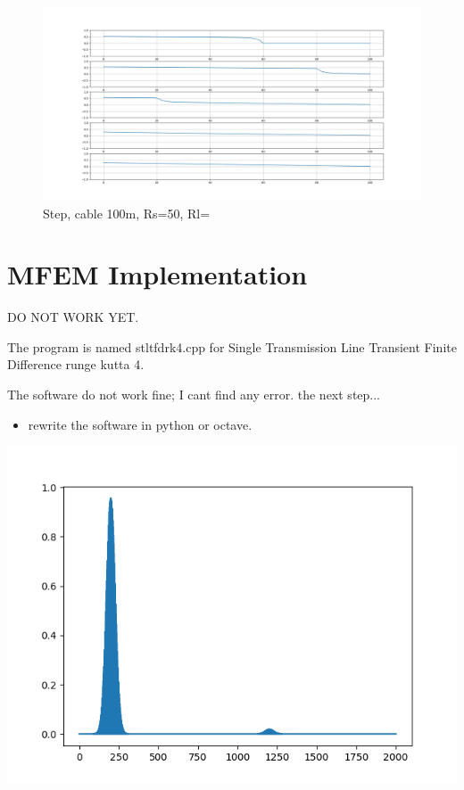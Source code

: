 \documentclass[12pt, letterpaper]{article}
\begin{document}
\begin{figure}[H]
	\centering
	\includegraphics[width=1\textwidth]{step-2.png} %
	\caption{Step, cable 100m, Rs=50, Rl=}
\end{figure}


\section{MFEM Implementation}

DO NOT WORK YET.

The program is named stltfdrk4.cpp for Single Transmission Line Transient Finite Difference runge kutta 4.



The software do not work fine; I cant find any error. the next step...
\begin{itemize}
	\item rewrite the software in python or octave.
\end{itemize}

\includegraphics{python-with-zero.png}
\end{document}
